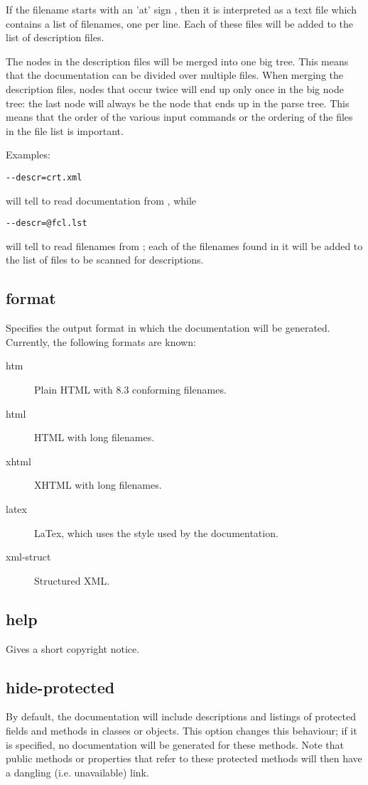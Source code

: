 If the filename starts with an 'at' sign , then it is interpreted
as a text file which contains a list of filenames, one per line. 
Each of these files will be added to the list of description files.

The nodes in the description files will be merged into one big tree. This
means that the documentation can be divided over multiple files. When
merging the description files, nodes that occur twice will end up only once
in the big node tree: the last node will always be the node that ends up in
the parse tree. This means that the order of the various input commands or
the ordering of the files in the file list is important.

Examples:
\begin{verbatim}
--descr=crt.xml 
\end{verbatim}
will tell \fpdoc to read documentation from , while
\begin{verbatim}
--descr=@fcl.lst 
\end{verbatim}
will tell \fpdoc to read filenames from ; each of the
filenames found in it will be added to the list of files to be scanned for
descriptions.

\subsection{format}
\label{suse:format}
Specifies the output format in which the documentation will be generated. 
Currently, the following formats are known:
\begin{description}
\item[htm] Plain HTML with 8.3 conforming filenames. 
\item[html] HTML with long filenames.
\item[xhtml] XHTML with long filenames.
\item[latex] LaTex, which uses the  style used by the \fpc
documentation. 
\item[xml-struct] Structured XML.
\end{description}

\subsection{help}
Gives a short copyright notice.

\subsection{hide-protected}
\label{suse:hideprotected}
By default, the documentation will include descriptions and listings of
protected fields and methods in classes or objects. This option changes this
behaviour; if it is specified, no documentation will be generated for these
methods. Note that public methods or properties that refer to these
protected methods will then have a dangling (i.e. unavailable) link.

